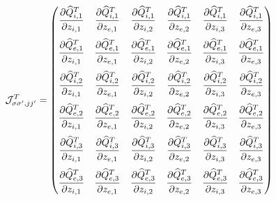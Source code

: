 \documentclass[dvips,12pt]{revtex4}
\newcommand\qhat{\widehat{Q}}
\newcommand{\sspjjp}{{\sigma\sigma^\prime,jj^\prime}}
\begin{document}
\begin{equation}
{\cal J}^T_{\sspjjp} = \begin{pmatrix}
\displaystyle \frac{\partial \qhat^T_{i,1}}{\partial z_{i,1}} &
\displaystyle \frac{\partial \qhat^T_{i,1}}{\partial z_{e,1}} &
\displaystyle \frac{\partial \qhat^T_{i,1}}{\partial z_{i,2}} &
\displaystyle \frac{\partial \qhat^T_{i,1}}{\partial z_{e,2}} &
\displaystyle \frac{\partial \qhat^T_{i,1}}{\partial z_{i,3}} &
\displaystyle \frac{\partial \qhat^T_{i,1}}{\partial z_{e,3}} 
\medskip \\
\displaystyle \frac{\partial \qhat^T_{e,1}}{\partial z_{i,1}} &
\displaystyle \frac{\partial \qhat^T_{e,1}}{\partial z_{e,1}} &
\displaystyle \frac{\partial \qhat^T_{e,1}}{\partial z_{i,2}} &
\displaystyle \frac{\partial \qhat^T_{e,1}}{\partial z_{e,2}} &
\displaystyle \frac{\partial \qhat^T_{e,1}}{\partial z_{i,3}} &
\displaystyle \frac{\partial \qhat^T_{e,1}}{\partial z_{e,3}} 
\medskip \\
\displaystyle \frac{\partial \qhat^T_{i,2}}{\partial z_{i,1}} &
\displaystyle \frac{\partial \qhat^T_{i,2}}{\partial z_{e,1}} &
\displaystyle \frac{\partial \qhat^T_{i,2}}{\partial z_{i,2}} &
\displaystyle \frac{\partial \qhat^T_{i,2}}{\partial z_{e,2}} &
\displaystyle \frac{\partial \qhat^T_{i,2}}{\partial z_{i,3}} &
\displaystyle \frac{\partial \qhat^T_{i,2}}{\partial z_{e,3}} 
\medskip \\
\displaystyle \frac{\partial \qhat^T_{e,2}}{\partial z_{i,1}} &
\displaystyle \frac{\partial \qhat^T_{e,2}}{\partial z_{e,1}} &
\displaystyle \frac{\partial \qhat^T_{e,2}}{\partial z_{i,2}} &
\displaystyle \frac{\partial \qhat^T_{e,2}}{\partial z_{e,2}} &
\displaystyle \frac{\partial \qhat^T_{e,2}}{\partial z_{i,3}} &
\displaystyle \frac{\partial \qhat^T_{e,2}}{\partial z_{e,3}} 
\medskip \\
\displaystyle \frac{\partial \qhat^T_{i,3}}{\partial z_{i,1}} &
\displaystyle \frac{\partial \qhat^T_{i,3}}{\partial z_{e,1}} &
\displaystyle \frac{\partial \qhat^T_{i,3}}{\partial z_{i,2}} &
\displaystyle \frac{\partial \qhat^T_{i,3}}{\partial z_{e,2}} &
\displaystyle \frac{\partial \qhat^T_{i,3}}{\partial z_{i,3}} &
\displaystyle \frac{\partial \qhat^T_{i,3}}{\partial z_{e,3}} 
\medskip \\
\displaystyle \frac{\partial \qhat^T_{e,3}}{\partial z_{i,1}} &
\displaystyle \frac{\partial \qhat^T_{e,3}}{\partial z_{e,1}} &
\displaystyle \frac{\partial \qhat^T_{e,3}}{\partial z_{i,2}} &
\displaystyle \frac{\partial \qhat^T_{e,3}}{\partial z_{e,2}} &
\displaystyle \frac{\partial \qhat^T_{e,3}}{\partial z_{i,3}} &
\displaystyle \frac{\partial \qhat^T_{e,3}}{\partial z_{e,3}} 
\end{pmatrix}
\end{equation}
\end{document}
